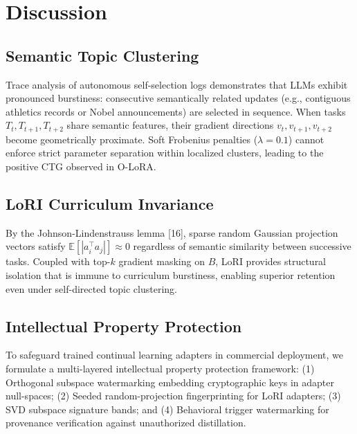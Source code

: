 \documentclass[10pt,journal,compsoc]{IEEEtran}
\begin{document}
\section{Discussion}

\subsection{Semantic Topic Clustering}
Trace analysis of autonomous self-selection logs demonstrates that LLMs exhibit pronounced burstiness: consecutive semantically related updates (e.g., contiguous athletics records or Nobel announcements) are selected in sequence. When tasks $T_t, T_{t+1}, T_{t+2}$ share semantic features, their gradient directions $v_t, v_{t+1}, v_{t+2}$ become geometrically proximate. Soft Frobenius penalties ($\lambda=0.1$) cannot enforce strict parameter separation within localized clusters, leading to the positive CTG observed in O-LoRA.

\subsection{LoRI Curriculum Invariance}
By the Johnson-Lindenstrauss lemma [16], sparse random Gaussian projection vectors satisfy $\mathbb{E}[|a_i^\top a_j|] \approx 0$ regardless of semantic similarity between successive tasks. Coupled with top-$k$ gradient masking on $B$, LoRI provides structural isolation that is immune to curriculum burstiness, enabling superior retention even under self-directed topic clustering.

\subsection{Intellectual Property Protection}
To safeguard trained continual learning adapters in commercial deployment, we formulate a multi-layered intellectual property protection framework: (1) Orthogonal subspace watermarking embedding cryptographic keys in adapter null-spaces; (2) Seeded random-projection fingerprinting for LoRI adapters; (3) SVD subspace signature bands; and (4) Behavioral trigger watermarking for provenance verification against unauthorized distillation.
\end{document}

